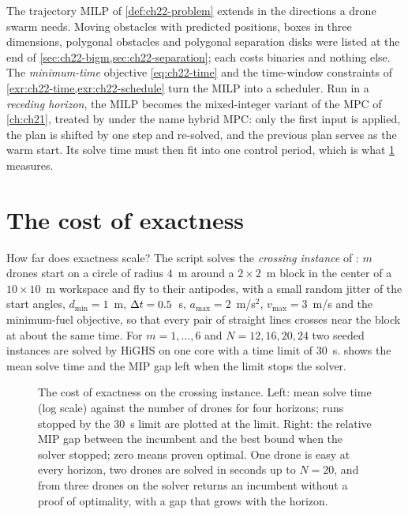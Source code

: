 The trajectory MILP of \cref{def:ch22-problem} extends in the directions a
drone swarm needs. Moving obstacles with predicted positions, boxes in
three dimensions, polygonal obstacles and polygonal separation disks were
listed at the end of \cref{sec:ch22-bigm,sec:ch22-separation}; each costs
binaries and nothing else. The \emph{minimum-time} objective
\cref{eq:ch22-time} and the time-window constraints of
\cref{exr:ch22-time,exr:ch22-schedule} turn the MILP into a scheduler. Run in a \emph{receding horizon}, the MILP
becomes the mixed-integer variant of the MPC of \cref{ch:ch21}, treated by
\textcite{borrelli2017predictive} under the name hybrid MPC: only the
first input is applied, the plan is shifted by one step and re-solved, and
the previous plan serves as the warm start. Its solve time must then fit
into one control period, which is what \cref{sec:ch22-cost} measures.

\section{The cost of exactness}
\label{sec:ch22-cost}

How far does exactness scale? The script 
solves the \emph{crossing instance} of : $m$ drones
start on a circle of radius $4$~m around a $2 \times 2$~m block in the
center of a $10 \times 10$~m workspace and fly to their antipodes, with a
small random jitter of the start angles, $d_{\min} = 1$~m, $\Delta t = 0.5$~s,
$a_{\max} = 2$~m/s$^2$, $v_{\max} = 3$~m/s and the minimum-fuel
objective, so that every pair of straight lines crosses near the block at
about the same time. For $m = 1, \dots, 6$ and $N = 12, 16, 20, 24$ two
seeded instances are solved by HiGHS on one core with a time limit of
$30$~s.  shows the mean solve time and the MIP gap
left when the limit stops the solver.

\begin{figure}[tb]
  \centering
  \caption{The cost of exactness on the crossing instance. Left: mean
  solve time (log scale) against the number of drones for four horizons;
  runs stopped by the $30$~s limit are plotted at the limit. Right: the
  relative MIP gap between the incumbent and the best bound when the
  solver stopped; zero means proven optimal. One drone is easy at every
  horizon, two drones are solved in seconds up to $N = 20$, and from three
  drones on the solver returns an incumbent without a proof of optimality,
  with a gap that grows with the horizon.}
  \label{fig:ch22-scaling}
\end{figure}

